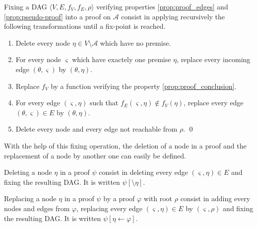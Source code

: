 \documentclass{llncs}
\begin{document}
\begin{definition}[Fixing]
Fixing a DAG $\langle V, E, f_V, f_E, \rho \rangle$ verifying properties \ref{prop:proof_edges} and
\ref{prop:pseudo-proof} into a proof on $\mathcal{A}$ consist in applying recursively the following
transformations until a fix-point is reached.
\begin{enumerate}
  \item Delete every node $\eta \in V \setminus \mathcal{A}$ which have no premise.
  \item For every node $\varsigma$ which have exactely one premise $\eta$, replace every incoming
    edge $(\theta,\varsigma)$ by $(\theta,\eta)$.
  \item Replace $f_V$ by a function verifying the property \ref{prop:proof_conclusion}.
  \item For every edge $(\varsigma,\eta)$ such that $f_E(\varsigma,\eta) \notin f_V(\eta)$, replace
    every edge $(\theta,\varsigma) \in E$ by $(\theta,\eta)$.
  \item Delete every node and every edge not reachable from $\rho$.
  \qed
\end{enumerate}
\end{definition}


With the help of this fixing operation, the deletion of a node in a proof and the replacement of a
node by another one can easily be defined.

\begin{definition}
Deleting a node $\eta$ in a proof $\psi$ consist in deleting every edge $(\varsigma,\eta) \in E$ and
fixing the resulting DAG. It is written $\psi[\setminus \eta]$.
\end{definition}

\begin{definition}
Replacing a node $\eta$ in a proof $\psi$ by a proof $\varphi$ with root $\rho$ consist in adding
every nodes and edges from $\varphi$, replacing every edge $(\varsigma,\eta) \in E$ by
$(\varsigma,\rho)$ and fixing the resulting DAG.  It is written $\psi[\eta \leftarrow \varphi]$.
\end{definition}
\end{document}

